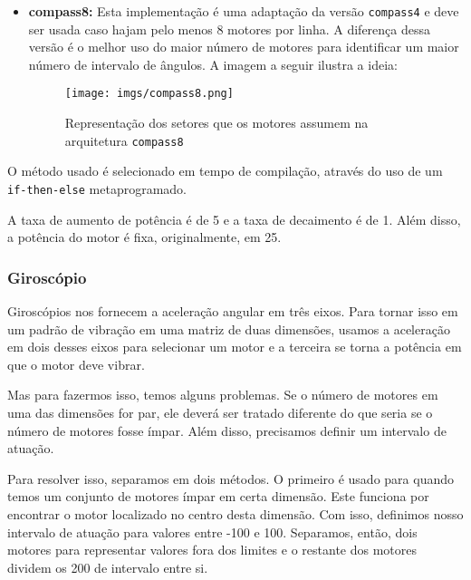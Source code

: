 \documentclass{sig-alternate-05-2015}
\begin{document}
\begin{itemize}
                \item \textbf{compass8:} Esta implementação é uma adaptação da
                    versão \texttt{compass4} e deve ser usada caso hajam pelo
                    menos 8 motores por linha. A diferença dessa versão é o
                    melhor uso do maior número de motores para identificar um
                    maior número de intervalo de ângulos. A imagem a seguir
                    ilustra a ideia:
                \begin{figure}[h!]
                    \centering
                    \texttt{[image: imgs/compass8.png]}
                    \caption{Representação dos setores que os motores assumem na arquitetura \texttt{compass8}}
                    \label{fig2}
                \end{figure}
                
            \end{itemize}
            
            O método usado é selecionado em tempo de compilação, através do uso
            de um \texttt{if-then-else} metaprogramado.
            
            A taxa de aumento de potência é de 5 e a taxa de decaimento é de 1.
            Além disso, a potência do motor é fixa, originalmente, em 25.
            
        \subsubsection{Giroscópio}
            Giroscópios nos fornecem a aceleração angular em três eixos. Para
            tornar isso em um padrão de vibração em uma matriz de duas
            dimensões, usamos a aceleração em dois desses eixos para selecionar
            um motor e a terceira se torna a potência em que o motor deve
            vibrar.
            
            Mas para fazermos isso, temos alguns problemas. Se o número de
            motores em uma das dimensões for par, ele deverá ser tratado
            diferente do que seria se o número de motores fosse ímpar. Além
            disso, precisamos definir um intervalo de atuação.
            
            Para resolver isso, separamos em dois métodos. O primeiro é usado
            para quando temos um conjunto de motores ímpar em certa dimensão.
            Este funciona por encontrar o motor localizado no centro desta
            dimensão. Com isso, definimos nosso intervalo de atuação para
            valores entre -100 e 100. Separamos, então, dois motores para
            representar valores fora dos limites e o restante dos motores
            dividem os 200 de intervalo entre si.
            
\end{document}
